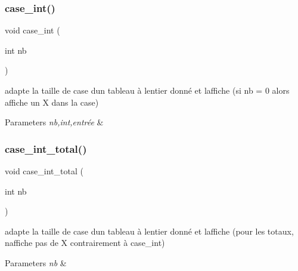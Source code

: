 \subsubsection{\texorpdfstring{case\+\_\+int()}{case\_int()}}
{\footnotesize\ttfamily void case\+\_\+int (\begin{DoxyParamCaption}\item[{int}]{nb }\end{DoxyParamCaption})}



adapte la taille de case d\textquotesingle{}un tableau à l\textquotesingle{}entier donné et l\textquotesingle{}affiche (si nb = 0 alors affiche un X dans la case) 


\begin{DoxyParams}{Parameters}
{\em nb,int,entrée} & \\
\hline
\end{DoxyParams}
\mbox{\label{yams___cleo___martin-_colleu__2_80_8c_ad2143ef8ea16cfc017c7f006af3385cb}} 
\subsubsection{\texorpdfstring{case\+\_\+int\+\_\+total()}{case\_int\_total()}}
{\footnotesize\ttfamily void case\+\_\+int\+\_\+total (\begin{DoxyParamCaption}\item[{int}]{nb }\end{DoxyParamCaption})}



adapte la taille de case d\textquotesingle{}un tableau à l\textquotesingle{}entier donné et l\textquotesingle{}affiche (pour les totaux, n\textquotesingle{}affiche pas de X contrairement à case\+\_\+int) 


\begin{DoxyParams}{Parameters}
{\em nb} & \\
\hline
\end{DoxyParams}
\mbox{\label{yams___cleo___martin-_colleu__2_80_8c_a7cfeb8762d6de0ebff12f95682f49806}} 

